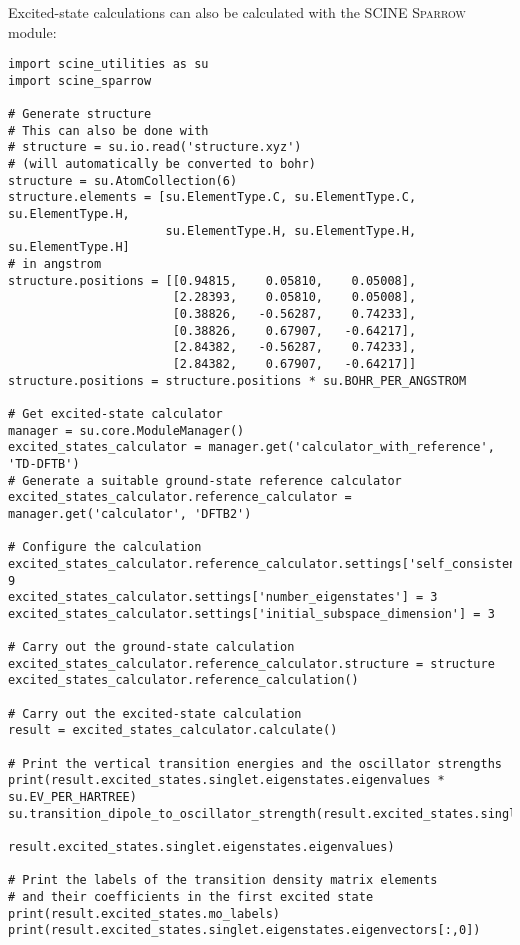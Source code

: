 \documentclass[]{tufte-book}
\begin{document}
Excited-state calculations can also be calculated with the SCINE \textsc{Sparrow} module:
\begin{verbatim}
import scine_utilities as su
import scine_sparrow

# Generate structure
# This can also be done with 
# structure = su.io.read('structure.xyz')
# (will automatically be converted to bohr)
structure = su.AtomCollection(6)
structure.elements = [su.ElementType.C, su.ElementType.C, su.ElementType.H, 
                      su.ElementType.H, su.ElementType.H, su.ElementType.H]
# in angstrom                                                                
structure.positions = [[0.94815,    0.05810,    0.05008], 
                       [2.28393,    0.05810,    0.05008],       
                       [0.38826,   -0.56287,    0.74233],       
                       [0.38826,    0.67907,   -0.64217],       
                       [2.84382,   -0.56287,    0.74233],       
                       [2.84382,    0.67907,   -0.64217]]
structure.positions = structure.positions * su.BOHR_PER_ANGSTROM

# Get excited-state calculator
manager = su.core.ModuleManager()
excited_states_calculator = manager.get('calculator_with_reference', 'TD-DFTB')
# Generate a suitable ground-state reference calculator
excited_states_calculator.reference_calculator = manager.get('calculator', 'DFTB2')

# Configure the calculation
excited_states_calculator.reference_calculator.settings['self_consistence_criterion']=1e-9
excited_states_calculator.settings['number_eigenstates'] = 3
excited_states_calculator.settings['initial_subspace_dimension'] = 3

# Carry out the ground-state calculation
excited_states_calculator.reference_calculator.structure = structure
excited_states_calculator.reference_calculation()

# Carry out the excited-state calculation
result = excited_states_calculator.calculate()

# Print the vertical transition energies and the oscillator strengths
print(result.excited_states.singlet.eigenstates.eigenvalues * su.EV_PER_HARTREE)
su.transition_dipole_to_oscillator_strength(result.excited_states.singlet.transition_dipoles, 
                                            result.excited_states.singlet.eigenstates.eigenvalues)

# Print the labels of the transition density matrix elements
# and their coefficients in the first excited state
print(result.excited_states.mo_labels)
print(result.excited_states.singlet.eigenstates.eigenvectors[:,0])
\end{verbatim}
\end{document}
